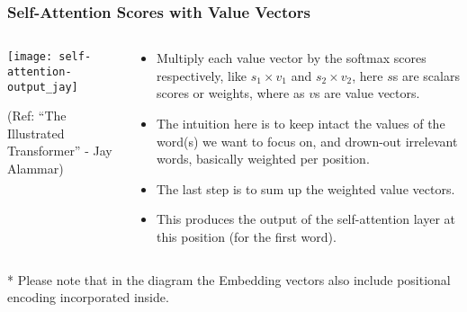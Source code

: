 \begin{frame}[fragile]\frametitle{Self-Attention Scores with Value Vectors}

\begin{columns}
    \begin{column}[T]{0.5\linewidth}
\begin{center}
\texttt{[image: self-attention-output\_jay]}


{\tiny (Ref: ``The Illustrated Transformer'' - Jay Alammar)}
\end{center}		

		\end{column}
    \begin{column}[T]{0.5\linewidth}

\begin{itemize}
\item Multiply each value vector by the softmax scores respectively, like $s_1 \times v_1$ and $s_2 \times v_2$, here $s$s are scalars scores or weights, where as $v$s are value vectors.
\item The intuition here is to keep intact the values of the word(s) we want to focus on, and drown-out irrelevant words, basically weighted per position.
\item The last step is to sum up the weighted value vectors.
\item This produces the output of the self-attention layer at this position (for the first word).
\end{itemize}
    \end{column}
  \end{columns}

* Please note that in the diagram the Embedding vectors also include positional encoding incorporated inside.
\end{frame}

